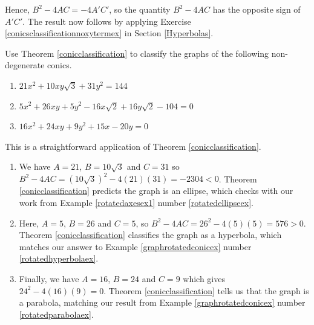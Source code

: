\documentclass{ximera}
\begin{document}
Hence, $B^2 - 4AC = -4 A'C'$, so the quantity $B^2 - 4AC$ has the opposite sign of $A'C'$.  The result now follows by applying  Exercise \ref{conicsclassificationnoxytermex} in Section \ref{Hyperbolas}.

\begin{example} \label{conicdiscex}  Use Theorem \ref{conicclassification} to classify the graphs of the following non-degenerate conics.

\begin{enumerate}

\item   $21x^2+10xy\sqrt{3}+31y^2=144$  

\item   $5x^2+26xy+5y^2-16x\sqrt{2}+16y\sqrt{2}-104 = 0$  

\item   $16x^2+24xy+9y^2 +15x-20y = 0$  

\end{enumerate}

\begin{explanation} This is a straightforward application of Theorem \ref{conicclassification}.

 \begin{enumerate}
 
\item  We have $A = 21$, $B = 10\sqrt{3}$ and $C = 31$ so $B^2 - 4AC = (10\sqrt{3})^2 - 4(21)(31) = -2304 < 0$.  Theorem \ref{conicclassification} predicts the graph is an ellipse, which checks with our work from Example \ref{rotatedaxesex1} number \ref{rotatedellipseex}.
 
\item  Here,  $A = 5$, $B = 26$ and $C = 5$, so $B^2 - 4AC = 26^2 - 4(5)(5) = 576 > 0$. Theorem \ref{conicclassification} classifies the graph as a hyperbola, which matches our answer to Example \ref{graphrotatedconicex} number \ref{rotatedhyperbolaex}. 

\item  Finally,  we have $A = 16$, $B = 24$ and $C = 9$ which gives $24^2 - 4(16)(9) = 0$. Theorem \ref{conicclassification} tells us that the graph is a parabola,  matching our result from Example \ref{graphrotatedconicex} number \ref{rotatedparabolaex}. 

\end{enumerate}
\end{explanation}

\end{example}
\end{document}
